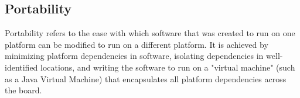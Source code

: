 \subsection{Portability}

Portability refers to the ease with which software that was created to run on one platform can be modified to run on a different platform. It is achieved by minimizing platform dependencies in software, isolating dependencies in well-identified locations, and writing the software to run on a "virtual machine" (such as a Java Virtual Machine) that encapsulates all platform dependencies across the board.